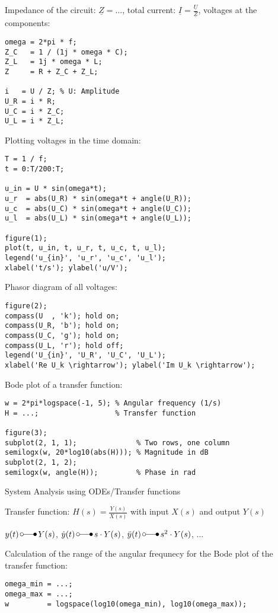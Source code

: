 \documentclass[a4paper,fontsize=11pt,parskip]{scrartcl}
\begin{document}
Impedance of the circuit: $\underline Z = \dots$, total current: $\underline I = \frac{\underline U}{\underline Z}$, voltages at the components:
\begin{lstlisting}
omega = 2*pi * f;
Z_C   = 1 / (1j * omega * C);
Z_L   = 1j * omega * L;
Z     = R + Z_C + Z_L;

i   = U / Z; % U: Amplitude
U_R = i * R;
U_C = i * Z_C;
U_L = i * Z_L;
\end{lstlisting}

Plotting voltages in the time domain:
\begin{lstlisting}
T = 1 / f;
t = 0:T/200:T;

u_in = U * sin(omega*t);
u_r  = abs(U_R) * sin(omega*t + angle(U_R));
u_c  = abs(U_C) * sin(omega*t + angle(U_C));
u_l  = abs(U_L) * sin(omega*t + angle(U_L));

figure(1);
plot(t, u_in, t, u_r, t, u_c, t, u_l);
legend('u_{in}', 'u_r', 'u_c', 'u_l');
xlabel('t/s'); ylabel('u/V');
\end{lstlisting}

Phasor diagram of all voltages:
\begin{lstlisting}
figure(2);
compass(U  , 'k'); hold on;
compass(U_R, 'b'); hold on;
compass(U_C, 'g'); hold on;
compass(U_L, 'r'); hold off;
legend('U_{in}', 'U_R', 'U_C', 'U_L');
xlabel('Re U_k \rightarrow'); ylabel('Im U_k \rightarrow');
\end{lstlisting}

Bode plot of a transfer function:
\begin{lstlisting}
w = 2*pi*logspace(-1, 5); % Angular frequency (1/s)
H = ...;                  % Transfer function

figure(3);
subplot(2, 1, 1);              % Two rows, one column
semilogx(w, 20*log10(abs(H))); % Magnitude in dB
subplot(2, 1, 2);
semilogx(w, angle(H));         % Phase in rad
\end{lstlisting}

{\Large System Analysis using ODEs/Transfer functions}

Transfer function: $H(s) = \frac{Y(s)}{X(s)}$ with input $X(s)$ and output $Y(s)$

$y(t)\,\laplace\,Y(s)$, $\dot y(t)\,\laplace\,s\cdot Y(s)$, $\ddot y(t)\,\laplace\,s^2\cdot Y(s)$, $\dots$

Calculation of the range of the angular frequnecy for the Bode plot of the transfer function:
\begin{lstlisting}
omega_min = ...;
omega_max = ...;
w         = logspace(log10(omega_min), log10(omega_max));
\end{lstlisting}
\end{document}
